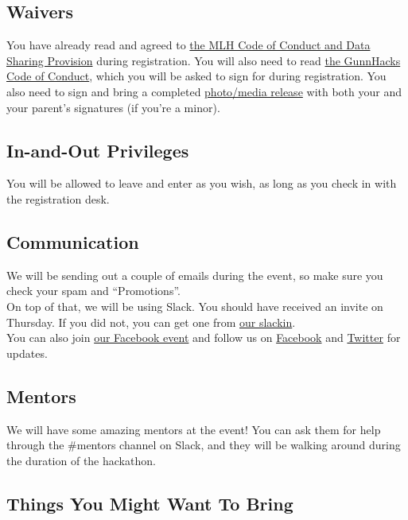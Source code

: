 \documentclass[12pt,onesided,letterpaper]{article}
\begin{document}
\subsection*{Waivers}

You have already read and agreed to \href{http://static.mlh.io/docs/mlh-code-of-conduct.pdf}{the MLH Code of Conduct and Data Sharing Provision} during registration. You will also need to read \href{https://gunnhacks.com/code.pdf}{the GunnHacks Code of Conduct}, which you will be asked to sign for during registration. You also need to sign and bring a completed \href{https://gunnhacks.com/waiver.pdf}{photo\slash media release} with both your and your parent's signatures (if you're a minor).

\subsection*{In-and-Out Privileges}

You will be allowed to leave and enter as you wish, as long as you check in with the registration desk.

\subsection*{Communication}

We will be sending out a couple of emails during the event, so make sure you check your spam and ``Promotions''.\\

On top of that, we will be using Slack. You should have received an invite on Thursday. If you did not, you can get one from \href{https://slack.gunnhacks.com}{our slackin}.\\

You can also join \href{https://www.facebook.com/events/1706103592980386/}{our Facebook event} and follow us on \href{https://www.facebook.com/GunnHacks}{Facebook} and \href{https://twitter.com/GunnHacks}{Twitter} for updates.

\subsection*{Mentors}

We will have some amazing mentors at the event! You can ask them for help through the \#mentors channel on Slack, and they will be walking around during the duration of the hackathon.

\subsection*{Things You Might Want To Bring}
\end{document}

